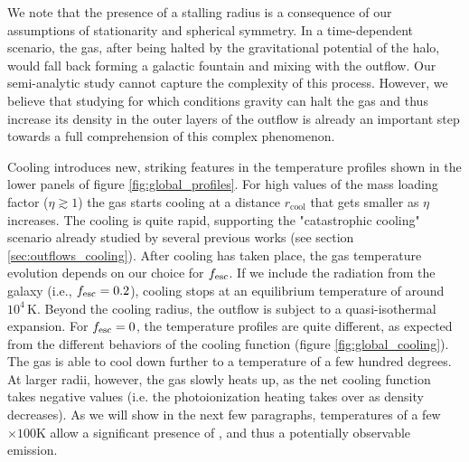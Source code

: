 We note that the presence of a stalling radius is a consequence of our assumptions of stationarity and spherical symmetry. In a time-dependent scenario, the gas, after being halted by the gravitational potential of the halo, would fall back forming a galactic fountain and mixing with the outflow. Our semi-analytic study cannot capture the complexity of this process. However, we believe that studying for which conditions gravity can halt the gas and thus increase its density in the outer layers of the outflow is already an important step towards a full comprehension of this complex phenomenon.

Cooling introduces new, striking features in the temperature profiles shown in the lower panels of figure \ref{fig:global_profiles}. For high values of the mass loading factor ($\eta \gtrsim 1$) the gas starts cooling at a distance $r_{\mathrm{cool}}$ that gets smaller as $\eta$ increases. The cooling is quite rapid, supporting the "catastrophic cooling" scenario already studied by several previous works (see section \ref{sec:outflows_cooling}). After cooling has taken place, the gas temperature evolution depends on our choice for $f_{\rm esc}$. If we include the radiation from the galaxy (i.e., $f_{\rm esc}=0.2$), cooling stops at an equilibrium temperature of around $10^4 \,\mathrm{K}$. Beyond the cooling radius, the outflow is subject to a quasi-isothermal expansion. For $f_{\rm esc}=0$, the temperature profiles are quite different, as expected from the different behaviors of the cooling function (figure \ref{fig:global_cooling}). The gas is able to cool down further to a temperature of a few hundred degrees. At larger radii, however, the gas slowly heats up, as the net cooling function takes negative values (i.e. the photoionization heating takes over as density decreases). As we will show in the next few paragraphs, temperatures of a few $\times 100$K allow a significant presence of \CIIion, and thus a potentially observable \CII emission. 




